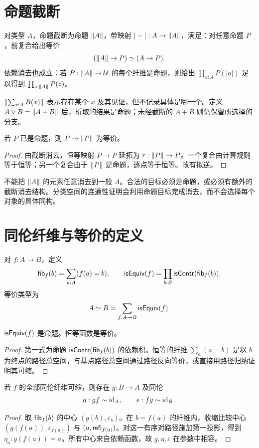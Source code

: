 \section{命题截断}
\begin{definition}[命题截断规则]
对类型 $A$，命题截断为命题 $\left\|A\right\|$，带映射 $|-|:A\to\left\|A\right\|$，满足：对任意命题 $P$，前复合给出等价
\[
(\left\|A\right\|\to P)\simeq(A\to P).
\]
依赖消去也成立：若 $P:\left\|A\right\|\to\mathcal U$ 的每个纤维是命题，则给出 $\prod_{a:A}P(|a|)$ 足以得到 $\prod_{z:\left\|A\right\|}P(z)$。
\end{definition}
\begin{example}
$\left\|\sum_{x:A}B(x)\right\|$ 表示存在某个 $x$ 及其见证，但不记录具体是哪一个。定义 $A\lor B=\left\|A+B\right\|$ 后，析取的结果是命题；未经截断的 $A+B$ 则仍保留所选择的分支。
\end{example}
\begin{proposition}
若 $P$ 已是命题，则 $P\to\left\|P\right\|$ 为等价。
\end{proposition}
\begin{proof}
由截断消去，恒等映射 $P\to P$ 延拓为 $r:\left\|P\right\|\to P$。一个复合由计算规则等于恒等；另一个复合由于 $\left\|P\right\|$ 是命题，逐点等于恒等。故有拟逆。
\end{proof}
\begin{remark}
不能把 $\left\|A\right\|$ 的元素任意消去到一般 $A$。合法的目标必须是命题，或必须有额外的截断消去结构。分类空间的连通性证明会利用命题目标完成消去，而不会选择每个对象的具体同构。
\end{remark}

\section{同伦纤维与等价的定义}
\begin{definition}[同伦纤维与等价]
对 $f:A\to B$，定义
\[
\mathsf{fib}_f(b)=\sum_{a:A}(f(a)=b),
\qquad
\mathsf{isEquiv}(f)=\prod_{b:B}\mathsf{isContr}(\mathsf{fib}_f(b)).
\]
等价类型为
\[
A\simeq B=\sum_{f:A\to B}\mathsf{isEquiv}(f).
\]
\end{definition}
\begin{proposition}
$\mathsf{isEquiv}(f)$ 是命题。恒等函数是等价。
\end{proposition}
\begin{proof}
第一式为命题 $\mathsf{isContr}(\mathsf{fib}_f(b))$ 的依赖积。恒等的纤维 $\sum_a(a=b)$ 是以 $b$ 为终点的路径总空间，与基点路径总空间通过路径反向等价，或直接用路径归纳证明其可缩。
\end{proof}
\begin{proposition}[等价给出拟逆]
若 $f$ 的全部同伦纤维可缩，则存在 $g:B\to A$ 及同伦
\[
\eta:gf\sim\operatorname{id}_A,
\qquad\varepsilon:fg\sim\operatorname{id}_B.
\]
\end{proposition}
\begin{proof}
取 $\mathsf{fib}_f(b)$ 的中心 $(g(b),\varepsilon_b)$。在 $b=f(a)$ 的纤维内，收缩比较中心 $(g(f(a)),\varepsilon_{f(a)})$ 与 $(a,\mathsf{refl}_{f(a)})$。对这一有序对路径施加第一投影，得到 $\eta_a:g(f(a))=a$。所有中心来自依赖函数，故 $g,\eta,\varepsilon$ 在参数中相容。
\end{proof}

